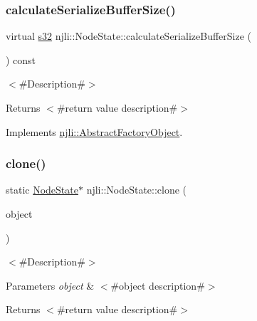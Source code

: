 \subsubsection{\texorpdfstring{calculate\+Serialize\+Buffer\+Size()}{calculateSerializeBufferSize()}}
{\footnotesize\ttfamily virtual \mbox{\hyperlink{_util_8h_aa62c75d314a0d1f37f79c4b73b2292e2}{s32}} njli\+::\+Node\+State\+::calculate\+Serialize\+Buffer\+Size (\begin{DoxyParamCaption}{ }\end{DoxyParamCaption}) const\hspace{0.3cm}{\ttfamily [virtual]}}

$<$\#\+Description\#$>$

\begin{DoxyReturn}{Returns}
$<$\#return value description\#$>$ 
\end{DoxyReturn}


Implements \mbox{\hyperlink{classnjli_1_1_abstract_factory_object_a4763d05bc9dc37c559111f8bb30e1dd8}{njli\+::\+Abstract\+Factory\+Object}}.

\mbox{\label{classnjli_1_1_node_state_a803f15ad59bfb455e70e159a9ab7912d}} 
\subsubsection{\texorpdfstring{clone()}{clone()}}
{\footnotesize\ttfamily static \mbox{\hyperlink{classnjli_1_1_node_state}{Node\+State}}$\ast$ njli\+::\+Node\+State\+::clone (\begin{DoxyParamCaption}\item[{const \mbox{\hyperlink{classnjli_1_1_node_state}{Node\+State}} \&}]{object }\end{DoxyParamCaption})\hspace{0.3cm}{\ttfamily [static]}}

$<$\#\+Description\#$>$


\begin{DoxyParams}{Parameters}
{\em object} & $<$\#object description\#$>$\\
\hline
\end{DoxyParams}
\begin{DoxyReturn}{Returns}
$<$\#return value description\#$>$ 
\end{DoxyReturn}
\mbox{\label{classnjli_1_1_node_state_abcdb692c2ef398c1f3d946a60105d549}} 
